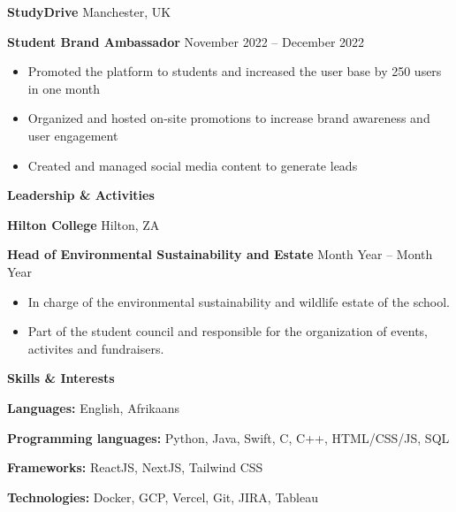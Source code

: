 \documentclass[11pt]{article}
\begin{document}
\textbf{StudyDrive} \hfill Manchester, UK

\textbf{Student Brand Ambassador} \hfill November 2022 – December 2022
\begin{itemize}[noitemsep, topsep=0pt, partopsep=0pt, parsep=0pt]
    \item Promoted the platform to students and increased the user base by 250 users in one month
    \item Organized and hosted on-site promotions to increase brand awareness and user engagement
    \item Created and managed social media content to generate leads
\end{itemize}

\begin{center}
    \textbf{Leadership \& Activities}
\end{center}

\textbf{Hilton College}	\hfill Hilton, ZA

\textbf{Head of Environmental Sustainability and Estate} \hfill Month Year – Month Year
\begin{itemize}[noitemsep, topsep=0pt, partopsep=0pt, parsep=0pt]
    \item In charge of the environmental sustainability and wildlife estate of the school.
    \item Part of the student council and responsible for the organization of events, activites and fundraisers.
\end{itemize}

\begin{center}
    \textbf{Skills \& Interests}
\end{center}

\textbf{Languages:} English, Afrikaans

\textbf{Programming languages:} Python, Java, Swift, C, C++, HTML/CSS/JS, SQL

\textbf{Frameworks:} ReactJS, NextJS, Tailwind CSS

\textbf{Technologies:} Docker, GCP, Vercel, Git, JIRA, Tableau
\end{document}
